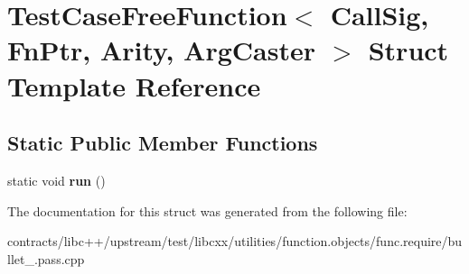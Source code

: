\hypertarget{struct_test_case_free_function}{}\section{Test\+Case\+Free\+Function$<$ Call\+Sig, Fn\+Ptr, Arity, Arg\+Caster $>$ Struct Template Reference}
\label{struct_test_case_free_function}
\subsection*{Static Public Member Functions}
\begin{DoxyCompactItemize}
\item 
\mbox{\label{struct_test_case_free_function_a041c94e6a1c9c3d64e883a787f975c83}} 
static void {\bfseries run} ()
\end{DoxyCompactItemize}


The documentation for this struct was generated from the following file\+:\begin{DoxyCompactItemize}
\item 
contracts/libc++/upstream/test/libcxx/utilities/function.\+objects/func.\+require/bullet\+\_.\+pass.\+cpp\end{DoxyCompactItemize}
